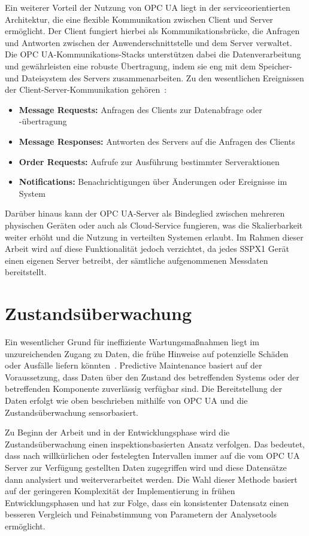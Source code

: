 Ein weiterer Vorteil der Nutzung von OPC UA liegt in der serviceorientierten Architektur, die eine flexible Kommunikation
zwischen Client und Server ermöglicht. Der Client fungiert hierbei als Kommunikationsbrücke, die Anfragen und Antworten zwischen
der Anwenderschnittstelle und dem Server verwaltet. Die OPC UA-Kommunikations-Stacks unterstützen dabei die Datenverarbeitung und
gewährleisten eine robuste Übertragung, indem sie eng mit dem Speicher- und Dateisystem des Servers zusammenarbeiten. Zu den
wesentlichen Ereignissen der Client-Server-Kommunikation gehören~\cite{Babel2024,iec62541,Mao2024}:
\begin{itemize}
    \item \textbf{Message Requests:} Anfragen des Clients zur Datenabfrage oder -übertragung
    \item \textbf{Message Responses:} Antworten des Servers auf die Anfragen des Clients
    \item \textbf{Order Requests:} Aufrufe zur Ausführung bestimmter Serveraktionen
    \item \textbf{Notifications:} Benachrichtigungen über Änderungen oder Ereignisse im System
\end{itemize}

Darüber hinaus kann der OPC UA-Server als Bindeglied zwischen mehreren physischen Geräten oder auch als Cloud-Service fungieren,
was die Skalierbarkeit weiter erhöht und die Nutzung in verteilten Systemen erlaubt. Im Rahmen dieser Arbeit wird auf diese Funktionalität
jedoch verzichtet, da jedes SSPX1 Gerät einen eigenen Server betreibt, der sämtliche aufgenommenen Messdaten bereitstellt.

\section{Zustandsüberwachung}\label{sec:zustandsueberwachung}
Ein wesentlicher Grund für ineffiziente Wartungsmaßnahmen liegt im unzureichenden Zugang zu Daten, die frühe Hinweise auf
potenzielle Schäden oder Ausfälle liefern könnten~\cite[S.~2]{Mobley2002}. Predictive Maintenance basiert auf der Voraussetzung, dass
Daten über den Zustand des betreffenden Systems oder der betreffenden Komponente zuverlässig verfügbar sind. Die Bereitstellung der
Daten erfolgt wie oben beschrieben mithilfe von OPC UA und die Zustandsüberwachung sensorbasiert.

Zu Beginn der Arbeit und in der Entwicklungsphase wird die Zustandsüberwachung einen inspektionsbasierten Ansatz verfolgen. Das
bedeutet, dass nach willkürlichen oder festelegten Intervallen immer auf die vom OPC UA Server zur Verfügung gestellten Daten
zugegriffen wird und diese Datensätze dann analysiert und weiterverarbeitet werden. Die Wahl dieser Methode basiert auf der
geringeren Komplexität der Implementierung in frühen Entwicklungsphasen und hat zur Folge, dass ein konsistenter Datensatz einen
besseren Vergleich und Feinabstimmung von Parametern der Analysetools ermöglicht.

